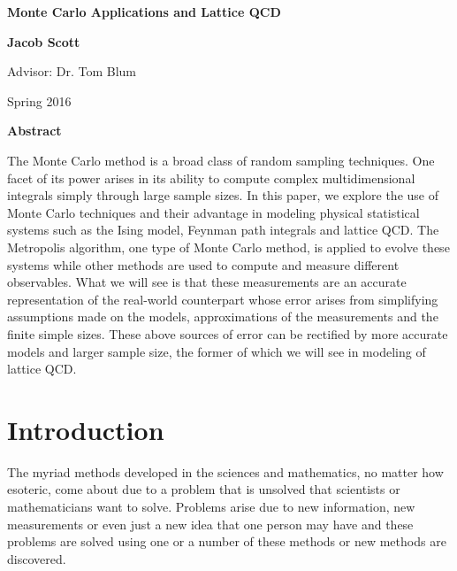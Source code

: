 \documentclass[11pt]{article}
\begin{document}
\thispagestyle{empty}
\begin{center}
	\vspace*{1cm}
		
	\LARGE
	\textbf{Monte Carlo Applications and Lattice QCD}
		
	\vspace{2cm}
	\Large
	\textbf{Jacob Scott}
		
	\vspace{1cm}
	Advisor: Dr. Tom Blum
		
	\vspace{1cm}
	Spring 2016
		
	\vspace{1.5cm}
	\normalsize
	\textbf{Abstract}
\end{center}

The Monte Carlo method is a broad class of random sampling techniques. One facet of its power arises in its ability to compute complex multidimensional integrals simply through large sample sizes. In this paper, we explore the use of Monte Carlo techniques and their advantage in modeling physical statistical systems such as the Ising model, Feynman path integrals and lattice QCD. The Metropolis algorithm, one type of Monte Carlo method, is applied to evolve these systems while other methods are used to compute and measure different observables. What we will see is that these measurements are an accurate representation of the real-world counterpart whose error arises from simplifying assumptions made on the models, approximations of the measurements and the finite simple sizes. These above sources of error can be rectified by more accurate models and larger sample size, the former of which we will see in modeling of lattice QCD.

\break

\tableofcontents
\newpage

\section{Introduction}

The myriad methods developed in the sciences and mathematics, no matter how esoteric, come about due to a problem that is unsolved that scientists or mathematicians want to solve. Problems arise due to new information, new measurements or even just a new idea that one person may have and these problems are solved using one or a number of these methods or new methods are discovered.
\end{document}
